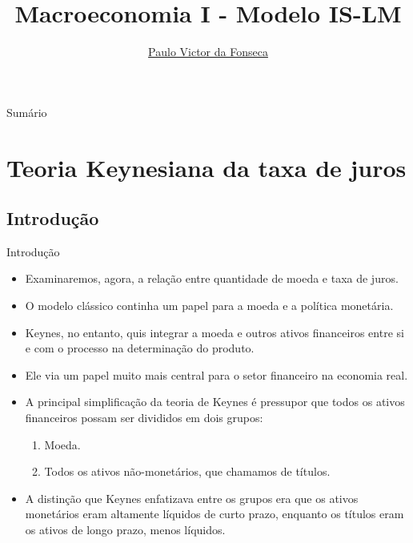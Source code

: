 \documentclass[10pt]{beamer}
\title[]{Macroeconomia I - Modelo IS-LM}
\author[]{\href{https://pvfonseca.github.io}{Paulo Victor da Fonseca}}
\date{}
\begin{document}
\begin{frame}[plain]
\end{frame}

\begin{frame}{Sumário}
    \tableofcontents
\end{frame}

\section{Teoria Keynesiana da taxa de juros}
\subsection{Introdução}
\begin{frame}{Introdução}
    \begin{itemize}
        \item Examinaremos, agora, a relação entre quantidade de moeda e taxa de juros.
        \bigskip
        \item O modelo clássico continha um papel para a moeda e a política monetária.
        \bigskip
        \item Keynes, no entanto, quis integrar a moeda e outros ativos financeiros entre si e com o processo na determinação do produto.
        \bigskip
        \item Ele via um papel muito mais central para o setor financeiro na economia real.
        \bigskip
        \item A principal simplificação da teoria de Keynes é pressupor que todos os ativos financeiros possam ser divididos em dois grupos:
        \bigskip
        \begin{enumerate}
            \item Moeda.
            \bigskip
            \item Todos os ativos não-monetários, que chamamos de títulos.
        \end{enumerate}
        \bigskip
        \item A distinção que Keynes enfatizava entre os grupos era que os ativos monetários eram altamente líquidos de curto prazo, enquanto os títulos eram os ativos de longo prazo, menos líquidos.
    \end{itemize}
\end{frame}
\end{document}
